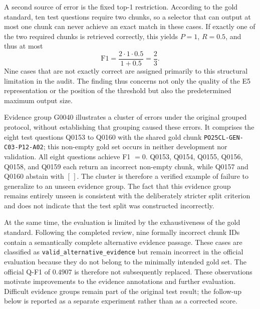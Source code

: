 \documentclass[11pt]{article}
\newcommand{\revision}[1]{{\color{blue}#1}}
\begin{document}
A second source of error is the fixed top-1 restriction. According to the gold standard, ten test questions require two chunks, so a selector that can output at most one chunk can never achieve an exact match in these cases. If exactly one of the two required chunks is retrieved correctly, this yields $P=1$, $R=0.5$, and thus at most
\begin{equation}
\mathrm{F1}=\frac{2\cdot1\cdot0.5}{1+0.5}=\frac{2}{3}.
\end{equation}
Nine cases that are not exactly correct are assigned primarily to this structural limitation in the audit. The finding thus concerns not only the quality of the E5 representation or the position of the threshold but also the predetermined maximum output size.

\revision{Evidence group G0040 illustrates a cluster of errors under the original grouped protocol, without establishing that grouping caused these errors.} It comprises the eight test questions Q0153 to Q0160 with the shared gold chunk \texttt{PO25CL-GEN-C03-P12-A02}; this non-empty gold set occurs in neither development nor validation. All eight questions achieve F1 $=0$. Q0153, Q0154, Q0155, Q0156, Q0158, and Q0159 each return an incorrect non-empty chunk, while Q0157 and Q0160 abstain with $[\,]$. The cluster is therefore a verified example of failure to generalize to an unseen evidence group. The fact that this evidence group remains entirely unseen is consistent with the deliberately stricter split criterion and does not indicate that the test split was constructed incorrectly.

At the same time, the evaluation is limited by the exhaustiveness of the gold standard. Following the completed review, nine formally incorrect chunk IDs contain a semantically complete alternative evidence passage. These cases are classified as \texttt{valid\_alternative\_evidence} but remain incorrect in the official evaluation because they do not belong to the minimally intended gold set. The official Q-F1 of $0.4907$ is therefore not subsequently replaced. \revision{These observations motivate improvements to the evidence annotations and further evaluation. Difficult evidence groups remain part of the original test result; the follow-up below is reported as a separate experiment rather than as a corrected score.}
\end{document}
